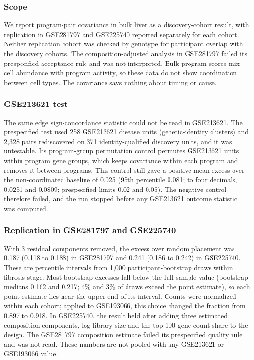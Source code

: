 \subsubsection{Scope}\label{scope}

We report program-pair covariance in bulk liver as a discovery-cohort result, with replication in GSE281797 and GSE225740 reported separately for each cohort. Neither replication cohort was checked by genotype for participant overlap with the discovery cohorts. The composition-adjusted analysis in GSE281797 failed its prespecified acceptance rule and was not interpreted. Bulk program scores mix cell abundance with program activity, so these data do not show coordination between cell types. The covariance says nothing about timing or cause.

\subsubsection{GSE213621 test}\label{gse213621-test}

The same edge sign-concordance statistic could not be read in GSE213621. The prespecified test used 258 GSE213621 disease units (genetic-identity clusters) and 2,328 pairs rediscovered on 371 identity-qualified discovery units, and it was untestable. Its program-group permutation control permutes GSE213621 units within program gene groups, which keeps covariance within each program and removes it between programs. This control still gave a positive mean excess over the non-coordinated baseline of 0.025 (95th percentile 0.081; to four decimals, 0.0251 and 0.0809; prespecified limits 0.02 and 0.05). The negative control therefore failed, and the run stopped before any GSE213621 outcome statistic was computed.

\subsubsection{Replication in GSE281797 and GSE225740}\label{replication-in-gse281797-and-gse225740}

With 3 residual components removed, the excess over random placement was 0.187 (0.118 to 0.188) in GSE281797 and 0.241 (0.186 to 0.242) in GSE225740. These are percentile intervals from 1,000 participant-bootstrap draws within fibrosis stage. Most bootstrap excesses fall below the full-sample value (bootstrap medians 0.162 and 0.217; 4\% and 3\% of draws exceed the point estimate), so each point estimate lies near the upper end of its interval. Counts were normalized within each cohort; applied to GSE193066, this choice changed the fraction from 0.897 to 0.918. In GSE225740, the result held after adding three estimated composition components, log library size and the top-100-gene count share to the design. The GSE281797 composition estimate failed its prespecified quality rule and was not read. These numbers are not pooled with any GSE213621 or GSE193066 value.

